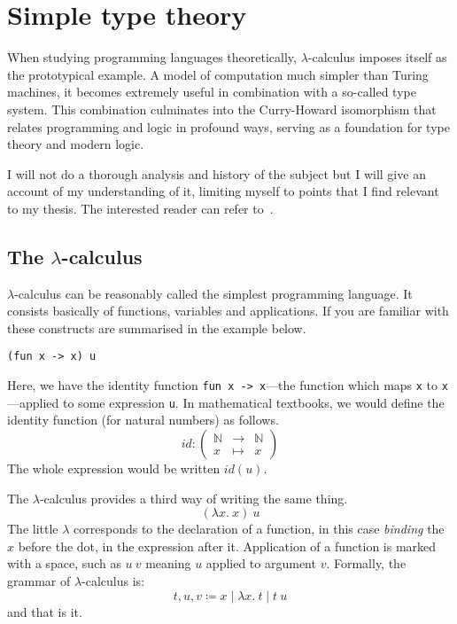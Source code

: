 \chapter{Simple type theory}

When studying programming languages theoretically, \(\lambda\)-calculus imposes
itself as the prototypical example. A model of computation much simpler than
Turing machines, it becomes extremely useful in combination with a so-called
type system. This combination culminates into the Curry-Howard isomorphism that
relates programming and logic in profound ways, serving as a foundation for
type theory and modern logic.

I will not do a thorough analysis and history of the subject but I will give an
account of my understanding of it, limiting myself to points that I find
relevant to my thesis. The interested reader can refer
to~.

\section{The \(\lambda\)-calculus}

\(\lambda\)-calculus can be reasonably called the simplest programming language.
It consists basically of functions, variables and applications.
If you are familiar with \ocaml these constructs are summarised in the example
below.
\begin{verbatim}
(fun x -> x) u
\end{verbatim}
Here, we have the identity function \texttt{fun x -> x}---\ie the
function which maps \texttt{x} to \texttt{x}---applied to
some expression \texttt{u}.
In mathematical textbooks, we would define the identity function (for natural
numbers) as follows.
\[
  \mathit{id} :
  \left(
  \begin{array}{lcl}
    \mathbb{N} &\to& \mathbb{N} \\
    x &\mapsto& x
  \end{array}
  \right)
\]
The whole expression would be written \(\mathit{id}(u)\).

The \(\lambda\)-calculus provides a third way of writing the same thing.
\[
  (\lambda x.\ x)\ u
\]
The little \(\lambda\) corresponds to the declaration of a function, in this
case \emph{binding} the \(x\) before the dot, in the expression after it.
Application of a function is marked with a space, such as \(u\ v\) meaning
\(u\) applied to argument \(v\).
Formally, the grammar of \(\lambda\)-calculus is:
\[
  t, u, v \coloneqq x \mid \lambda x.\ t \mid t\ u
\]
and that is it.

